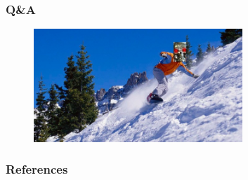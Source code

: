 \documentclass{beamer}
\begin{document}
\begin{frame}
  \frametitle{Q\&A}
  \begin{figure}
    \centering
    \includegraphics[width=0.7\textwidth]{gradient_descent.jpg}
  \end{figure}
\end{frame}


\begin{frame}[allowframebreaks]
\frametitle{References}
\footnotesize


\end{frame}
\end{document}
